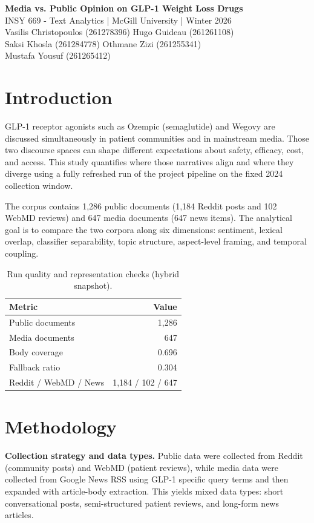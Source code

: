 \documentclass[10pt,letterpaper,twocolumn]{article}
\begin{document}
\begin{center}
{\LARGE \textbf{Media vs. Public Opinion on GLP-1 Weight Loss Drugs}}\\
\vspace{0.3em}
INSY 669 - Text Analytics | McGill University | Winter 2026\\
\vspace{0.6em}
Vasilis Christopoulos (261278396) \hfill Hugo Guideau (261261108)\\
Saksi Khosla (261284778) \hfill Othmane Zizi (261255341)\\
Mustafa Yousuf (261265412)
\end{center}

\section{Introduction}
GLP-1 receptor agonists such as Ozempic (semaglutide) and Wegovy are discussed simultaneously in patient communities and in mainstream media. Those two discourse spaces can shape different expectations about safety, efficacy, cost, and access. This study quantifies where those narratives align and where they diverge using a fully refreshed run of the project pipeline on the fixed 2024 collection window.

The corpus contains 1,286 public documents (1,184 Reddit posts and 102 WebMD reviews) and 647 media documents (647 news items). The analytical goal is to compare the two corpora along six dimensions: sentiment, lexical overlap, classifier separability, topic structure, aspect-level framing, and temporal coupling.

\begin{table}[H]
\centering
\caption{Run quality and representation checks (hybrid snapshot).}
\begin{tabular}{l r}
\hline
Metric & Value \\
\hline
Public documents & 1,286 \\
Media documents & 647 \\
Body coverage & 0.696 \\
Fallback ratio & 0.304 \\
Reddit / WebMD / News & 1,184 / 102 / 647 \\
\hline
\end{tabular}
\end{table}

\section{Methodology}
\textbf{Collection strategy and data types.} Public data were collected from Reddit (community posts) and WebMD (patient reviews), while media data were collected from Google News RSS using GLP-1 specific query terms and then expanded with article-body extraction. This yields mixed data types: short conversational posts, semi-structured patient reviews, and long-form news articles.
\end{document}
